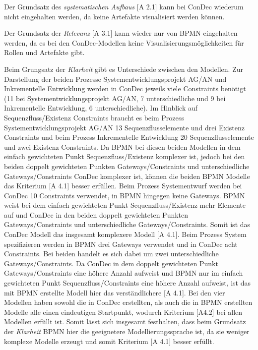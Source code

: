{ 
Der  Grundsatz des \textit{systematischen Aufbaus} [A 2.1] kann bei ConDec wiederum nicht eingehalten werden, da keine Artefakte visualisiert werden können.\newline

Der Grundsatz der \textit{Relevanz} [A 3.1] kann wieder nur von BPMN eingehalten werden, da es bei den ConDec-Modellen keine Visualisierungsmöglichkeiten für Rollen und Artefakte gibt.\newline


Beim Grungsatz der \textit{Klarheit} gibt es Unterschiede zwischen den Modellen. Zur Darstellung der beiden Prozesse Systementwicklungsprojekt AG/AN und Inkrementelle Entwicklung werden in ConDec jeweils viele Constraints benötigt (11 bei Systementwicklungsprojekt AG/AN, 7 unterschiedliche und 9 bei Inkrementelle Entwicklung, 6 unterschiedliche). Im Hinblick auf Sequenzfluss/Existenz Constraints braucht es beim Prozess Systementwicklungsprojekt AG/AN 13 Sequenzflusselemente und drei Existenz Constraints und beim Prozess Inkrementelle Entwicklung 20 Sequenzflusselemente und zwei Existenz Constraints.   Da BPMN bei diesen beiden Modellen in dem einfach gewichteten Punkt Sequenzfluss/Existenz komplexer ist, jedoch bei den beiden doppelt gewichteten Punkten Gateways/Constraints und unterschiedliche Gateways/Constraints ConDec komplexer ist, können die beiden BPMN Modelle das Kriterium [A 4.1] besser erfüllen.\newline
Beim Prozess Systementwurf werden bei ConDec 10 Constraints verwendet, in BPMN hingegen keine Gateways. BPMN weist bei dem einfach gewichteten Punkt Sequenzfluss/Existenz mehr Elemente auf und ConDec in den beiden doppelt gewichteten Punkten Gateways/Constraints und unterschiedliche Gateways/Constraints. Somit ist das ConDec Modell das insgesamt komplexere Modell [A 4.1].\newline
Beim Prozess System spezifizieren werden in BPMN drei Gateways verwendet und in ConDec acht Constraints. Bei beiden handelt es sich dabei um zwei unterschiedliche Gateways/Constraints. Da ConDec in dem doppelt gewichteten Punkt Gateways/Constraints eine höhere Anzahl aufweist und BPMN nur im einfach gewichteten Punkt Sequenzfluss/Constraints eine höhere Anzahl aufweist, ist das mit BPMN erstellte Modell hier das verständlichere [A 4.1]. \newline
Bei den vier Modellen haben sowohl die in ConDec erstellten, als auch die in BPMN erstellten Modelle alle einen eindeutigen Startpunkt, wodurch Kriterium [A4.2] bei allen Modellen erfüllt ist.\newline
Somit lässt sich insgesamt festhalten, dass beim Grundsatz der \textit{Klarheit} BPMN hier die geeignetere Modellierungssprache ist, da sie weniger komplexe Modelle erzeugt und somit Kriterium [A 4.1] besser erfüllt.\newline

}
